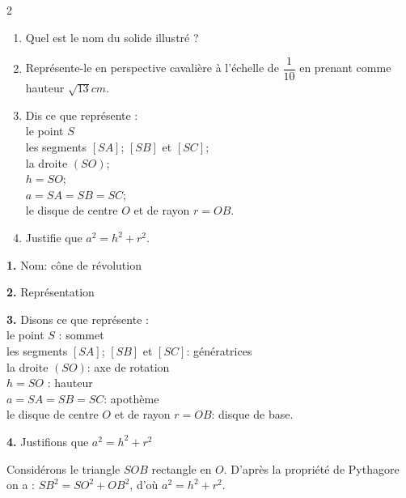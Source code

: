 \begin{multicols*}{2}
  	\begin{enumerate}
  		\item  Quel est le nom du solide illustré ?
  		\item  Représente-le en perspective cavalière à l'échelle de $\dfrac{1}{10}$ en prenant comme hauteur $\sqrt{13}cm$.
  		\item  Dis ce que représente :\\
  		 le point $S$\\
  		 les segments $[SA]$; $[SB]$ et $[SC]$;\\
  		 la droite $(SO)$;\\
  		 $h=SO$;\\
  		 $a=SA=SB=SC$;\\
  		 le disque de centre $O$ et de rayon $r=OB$.
  		\item  Justifie que $a^2=h^2+r^2$. 
  	\end{enumerate}
  	\dure
  	\resul
  	\textbf{1.} Nom: cône de révolution
  	
  	\textbf{2.} Représentation 
  	
  	\textbf{3.} Disons ce que représente :\\
  	 le point $S$ :  sommet \\
  	 les segments $[SA]$; $[SB]$ et $[SC]$: génératrices\\
  	 la droite $(SO)$: axe de rotation \\
  	 $h=SO$ : hauteur\\
  	 $a=SA=SB=SC$: apothème \\
  	 le disque de centre $O$ et de rayon $r=OB$:  disque de base.
  	
  	\textbf{4.} Justifions que $a^2=h^2+r^2$
  	
  	Considérons le triangle $SOB$ rectangle en $O$. D'après la propriété de Pythagore on a : $SB^2=SO^2 + OB^2$, d'où  $a^2=h^2+r^2$.
  	\newpage
\end{multicols*}
